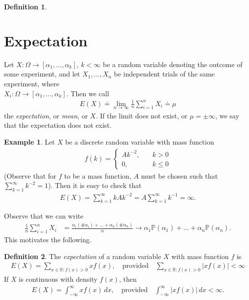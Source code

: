 \documentclass[12pt]{article}
\newcommand{\rr}{\mathbb{R}}
\newcommand{\prob}{\mathbb{P}}
\theoremstyle{plain}
\theoremstyle{definition}
\newtheorem*{definition}{Definition}
\newtheorem*{example}{Example}
\theoremstyle{remark}
\numberwithin{equation}{section}  %
\begin{document}
\begin{definition}
\section{Expectation}
Let $X: \Omega \to [\alpha_1, \ldots, \alpha_k]$, $k < \infty$ be a random
variable denoting the outcome of some experiment, and let $X_1, \ldots, X_n$ be independent trials
of the same experiment, where \\ $X_i:
\Omega \to [\alpha_1, \ldots, \alpha_k]$. Then we 
call
\begin{align*}
E(X) \doteq \lim_{n \to \infty} \frac{1}{n} \sum_{i =1}^n X_i \doteq \mu 
\end{align*}
the \emph{expectation}, or \emph{mean}, or $X$. If the limit does not exist,
or $\mu = \pm \infty$, we say that the expectation does not exist.
\end{definition}
\begin{example}
Let $X$ be a discrete random variable with mass function 
\begin{align*}
f(k) = \begin{cases}
Ak^{-2},  \quad &k > 0
\\
0, \quad & k \le 0
\end{cases}
\end{align*}
(Observe that for $f$ to be a mass function, $A$ must be chosen such that
$\sum_{k = 1}^{\infty} k^{-2} = 1$).
Then it is easy to check that
\begin{align*}
E(X) = \sum_{k=1}^{\infty} k Ak^{-2} = A \sum_{k=1}^{\infty} k^{-1} = \infty.
\end{align*}

\end{example}
Observe that we can write
\begin{align*}
\frac{1}{n} \sum_{i = 1}^n X_i
& = \frac{\alpha_i (\#\alpha_i) + \ldots +
\alpha_n (\#\alpha_n)}{n}
 \to \alpha_1 \prob(\alpha_1) + \ldots + \alpha_n \prob(\alpha_n).
\end{align*}
This motivates the following.
\begin{definition}
The \emph{expectation} of a random variable $X$ with mass function $f$ is
\begin{align*}
E(X) = \sum_{x \in \rr: f(x) > 0} x f(x), \quad \text{provided} \quad
\sum_{x \in \rr: f(x) > 0} |x
f(x) | <
\infty
\end{align*}
If $X$ is continuous with density $f(x)$, then
\begin{align*}
E(X) = \int_{-\infty}^{\infty} xf(x) \, dx, \quad \text{provided} \quad
\int_{-\infty}^{\infty} |xf(x)| \, dx < \infty.
\end{align*}
\end{definition}
\end{document}
